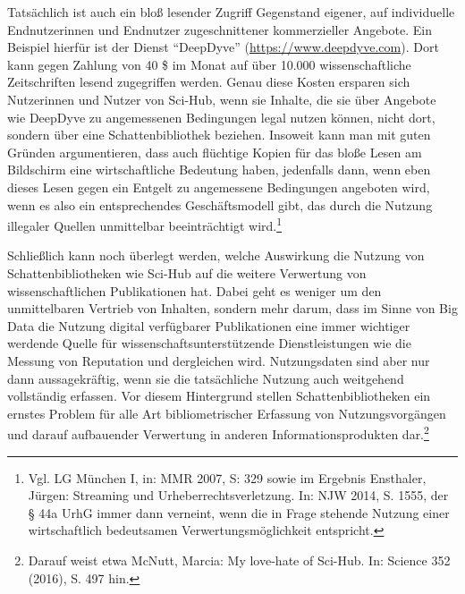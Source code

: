 \documentclass[a4paper,
fontsize=11pt,
oneside,
numbers=noperiodatend,
parskip=half-,
bibliography=totoc,
final
]{scrartcl}
\begin{document}
Tatsächlich ist auch ein bloß lesender Zugriff Gegenstand eigener, auf
individuelle Endnutzerinnen und Endnutzer zugeschnittener kommerzieller
Angebote. Ein Beispiel hierfür ist der Dienst \enquote{DeepDyve}
(\url{https://www.deepdyve.com}). Dort kann gegen Zahlung von 40 \$ im
Monat auf über 10.000 wissenschaftliche Zeitschriften lesend zugegriffen
werden. Genau diese Kosten ersparen sich Nutzerinnen und Nutzer von
Sci-Hub, wenn sie Inhalte, die sie über Angebote wie DeepDyve zu
angemessenen Bedingungen legal nutzen können, nicht dort, sondern über
eine Schattenbibliothek beziehen. Insoweit kann man mit guten Gründen
argumentieren, dass auch flüchtige Kopien für das bloße Lesen am
Bildschirm eine wirtschaftliche Bedeutung haben, jedenfalls dann, wenn
eben dieses Lesen gegen ein Entgelt zu angemessene Bedingungen angeboten
wird, wenn es also ein entsprechendes Geschäftsmodell gibt, das durch
die Nutzung illegaler Quellen unmittelbar beeinträchtigt wird.\footnote{Vgl.
  LG München I, in: MMR 2007, S: 329 sowie im Ergebnis Ensthaler,
  Jürgen: Streaming und Urheberrechtsverletzung. In: NJW 2014, S. 1555,
  der § 44a UrhG immer dann verneint, wenn die in Frage stehende Nutzung
  einer wirtschaftlich bedeutsamen Verwertungsmöglichkeit entspricht.}

Schließlich kann noch überlegt werden, welche Auswirkung die Nutzung von
Schattenbibliotheken wie Sci-Hub auf die weitere Verwertung von
wissenschaftlichen Publikationen hat. Dabei geht es weniger um den
unmittelbaren Vertrieb von Inhalten, sondern mehr darum, dass im Sinne
von Big Data die Nutzung digital verfügbarer Publikationen eine immer
wichtiger werdende Quelle für wissenschaftsunterstützende
Dienstleistungen wie die Messung von Reputation und dergleichen wird.
Nutzungsdaten sind aber nur dann aussagekräftig, wenn sie die
tatsächliche Nutzung auch weitgehend vollständig erfassen. Vor diesem
Hintergrund stellen Schattenbibliotheken ein ernstes Problem für alle
Art bibliometrischer Erfassung von Nutzungsvorgängen und darauf
aufbauender Verwertung in anderen Informationsprodukten dar.\footnote{Darauf
  weist etwa McNutt, Marcia: My love-hate of Sci-Hub. In: Science 352
  (2016), S. 497 hin.}
\end{document}
